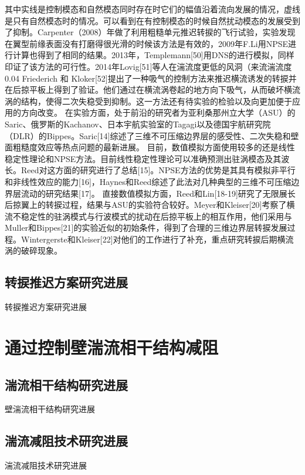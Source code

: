 其中实线是控制模态和自然模态同时存在时它们的幅值沿着流向发展的情况，虚线是只有自然模态时的情况。可以看到在有控制模态的时候自然扰动模态的发展受到了抑制。Carpenter（2008）年做了利用粗糙单元推迟转捩的飞行试验，实验发现在翼型前缘表面没有打磨得很光滑的时候该方法是有效的，2009年F.Li用NPSE进行计算也得到了相同的结果。2013年，Templemann[50]用DNS的进行模拟，同样印证了该方法的可行性。2014年Lovig[51]等人在湍流度更低的风洞（来流湍流度0.04%
Friederich 和 Kloker[52]提出了一种吸气的控制方法来推迟横流诱发的转捩并在后掠平板上得到了验证。他们通过在横流涡卷起的地方向下吸气，从而破坏横流涡的结构，使得二次失稳受到抑制。这一方法还有待实验的检验以及向更加便于应用的方向改变。
在实验方面，处于前沿的研究者为亚利桑那州立大学（ASU）的Saric、俄罗斯的Kachanov、日本宇航实验室的Tagagi以及德国宇航研究院（DLR）的Bippes。Saric[14]综述了三维不可压缩边界层的感受性、二次失稳和壁面粗糙度效应等热点问题的最新进展。
目前，数值模拟方面使用较多的还是线性稳定性理论和NPSE方法。目前线性稳定性理论可以准确预测出驻涡模态及其波长。Reed对这方面的研究进行了总结[15]。NPSE方法的优势是其具有模拟非平行和非线性效应的能力[16]，Haynes和Reed综述了此法对几种典型的三维不可压缩边界层流动的研究结果[17]。
直接数值模拟方面，Reed和Lin[18-19]研究了无限展长后掠翼上的转捩过程，结果与ASU的实验符合较好。Meyer和Kleiser[20]考察了横流不稳定性的驻涡模式与行波模式的扰动在后掠平板上的相互作用，他们采用与Muller和Bippes[21]的实验近似的初始条件，得到了合理的三维边界层转捩发展过程。Wintergerste和Kleiser[22]对他们的工作进行了补充，重点研究转捩后期横流涡的破碎现象。

\subsection{转捩推迟方案研究进展}
转捩推迟方案研究进展



\section{通过控制壁湍流相干结构减阻}
\subsection{湍流相干结构研究进展}
壁湍流相干结构研究进展
\subsection{湍流减阻技术研究进展}
\label{chap1:sample:table}
湍流减阻技术研究进展

